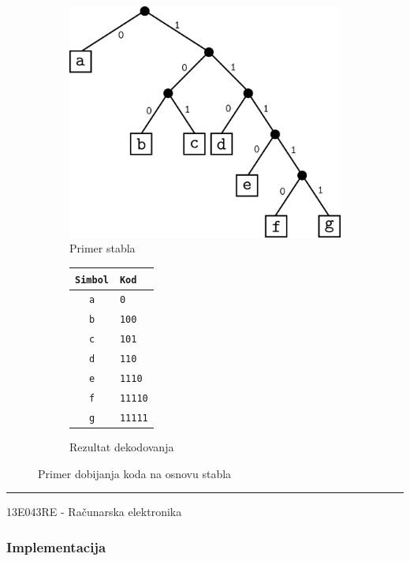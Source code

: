 \documentclass[a4paper, 12pt]{article}
\newcommand{\btmline}{
\vfill
\rule{0.9\textwidth}{0.4mm}
\begin{center}
13E043RE - Računarska elektronika
\end{center}}
\begin{document}
\begin{figure}[h!]
\centering
\begin{subfigure}{.45\textwidth}
	\centering
	\includegraphics[width=.95\linewidth]{codes}  
	\caption{Primer stabla}
	\label{stablo}
\end{subfigure}
\begin{subfigure}{.45\textwidth}
	\centering
	\begin{tabular}{|c|l|}
	\hline
	\verb|Simbol|	& \verb|Kod|	 \\\hline
	\verb|a|		& \verb|0|		\\\hline
	\verb|b|		& \verb|100|	\\\hline
	\verb|c|		& \verb|101|	\\\hline
	\verb|d|		& \verb|110|	\\\hline
	\verb|e|		& \verb|1110|	\\\hline
	\verb|f|		& \verb|11110|	\\\hline
	\verb|g|		& \verb|11111|	\\\hline
	\end{tabular}
	\caption{Rezultat dekodovanja}
\end{subfigure}
\caption{Primer dobijanja koda na osnovu stabla}
\end{figure}




\btmline\newpage

\subsubsection*{Implementacija}
\end{document}
